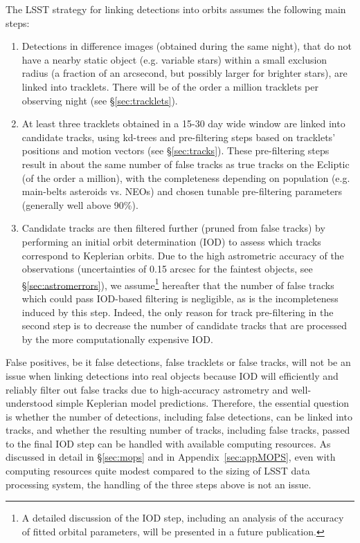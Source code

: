The LSST strategy for linking detections into orbits assumes the following main steps:
\begin{enumerate}
\item Detections in difference images (obtained during the same night), that do not
         have a nearby static object (e.g. variable stars) within a small exclusion radius
         (a fraction of an arcsecond, but possibly larger for brighter stars), are linked into tracklets. There will be of the order
         a million tracklets per observing night (see \S\ref{sec:tracklets}).
\item At least three tracklets obtained in a 15-30 day wide window are linked into
         candidate tracks, using kd-trees and pre-filtering steps based on tracklets' positions
         and motion vectors (see \S\ref{sec:tracks}). These pre-filtering steps result in
         about the same number of false tracks as true tracks on the Ecliptic (of the order
         a million), with the completeness depending on population (e.g. main-belts
         asteroids vs. NEOs) and chosen tunable pre-filtering parameters (generally well above 90\%).
\item Candidate tracks are then filtered further (pruned from false tracks) by
        performing an initial orbit determination (IOD) to assess which tracks
        correspond to Keplerian orbits. Due to the high astrometric accuracy of the observations (uncertainties of 0.15 arcsec for the faintest objects,
         see \S\ref{sec:astromerrors}), we assume\footnote{A detailed discussion of the IOD step, 
         including an analysis of the accuracy of fitted orbital parameters,  will be presented in 
         a future publication.} hereafter that the number of false tracks which 
         could pass IOD-based filtering is negligible, as is the incompleteness induced by this 
         step. Indeed, the only reason for track pre-filtering in the second step is to decrease the 
         number of candidate tracks that are processed by the more computationally expensive IOD.
\end{enumerate}

False positives, be it false detections, false tracklets or false tracks, will not be
an issue when linking detections into real objects because IOD will efficiently and reliably filter out false tracks due to high-accuracy
astrometry and well-understood simple Keplerian model predictions. Therefore, the
essential question is whether the number of detections, including false detections, can be linked into tracks, and whether the resulting
number of tracks, including false tracks, passed to the final IOD step can be handled with available computing resources.
As discussed in detail in \S\ref{sec:mops}
and in Appendix~\ref{sec:appMOPS}, even with computing resources quite modest compared to the
sizing of LSST data processing system, the handling of the three steps above is not an issue.
